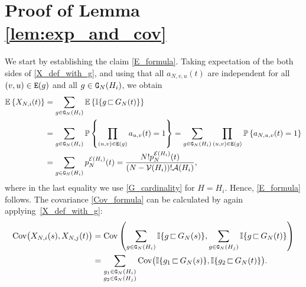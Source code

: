 \documentclass[11pt,reqno]{amsart}
\numberwithin{equation}{section}
\newcommand{\E}[1]{\mathbb{E}\left\{ #1\right\}}
\newcommand{\pk}[1]{\mathbb{P} \left\{ #1 \right \} }
\newcommand{\nelem}[1]{{Lemma \ref{#1}}}
\begin{document}
\section{Proof of \nelem{lem:exp_and_cov}}\label{section:proof_of_covariance}

We start by establishing the claim \eqref{E_formula}. Taking expectation of the both sides of \eqref{X_def_with_g}, and using that all $a_{N,v,u}(t)$ are independent for all $(v,u)\in{\tt E}(g)$ and all $g\in{\tt G}_N({H_i})$, we obtain
\begin{align*}
    \E{X_{N,i}(t)} &= \sum_{g\in{\tt G}_{N}({H_i})}\E{\mathbb{I}\{g{\,\sqsubset\,} G_N(t)\}}\notag\\
               &= \sum_{g\in{\tt G}_{N}({H_i})}\pk{\prod_{(u,v)\in{\tt E}(g)}a_{u,v}(t)=1}\notag= \sum_{g\in{\tt G}_{N}({H_i})}\prod_{(u,v)\in{\tt E}(g)}\pk{a_{N,u,v}(t)=1}\notag\\
               &= \sum_{g\in{\tt G}_{N}({H_i})}p_N^{\mathcal{E}({H_i})}(t)= \frac{N!p_N^{{\mathcal{E}}({H_i})}(t)}{(N-\mathcal{V}({H_i}))!\mathcal{A}({H_i})},
\end{align*}
where in the last equality we use \eqref{G_cardinality} for ${H=H_i}$. Hence, \eqref{E_formula} follows. The covariance \eqref{Cov_formula} can be calculated by again applying~\eqref{X_def_with_g}:
\begin{align}
    \operatorname{Cov}\bigl(X_{N,i}(s), X_{N,j}(t)\bigr) &= \operatorname{Cov}\left(\sum_{g\in{\tt G}_N({H_i})}\mathbb{I}\{g{\,\sqsubset\,} G_N(s)\}, \sum_{g\in{\tt G}_N({H_j})}\mathbb{I}\{g{\,\sqsubset\,} G_N(t)\}\right)\notag\\
    &=\sum_{\substack{g_1\in{\tt G}_N({H_i}) \\ g_2\in{\tt G}_N({H_j})}}\operatorname{Cov}\bigl(\mathbb{I}\{g_1{\,\sqsubset\,} G_N(s)\}, \mathbb{I}\{g_2{\,\sqsubset\,} G_N(t)\}\bigr).\label{X_cov_1}
\end{align}
\end{document}
